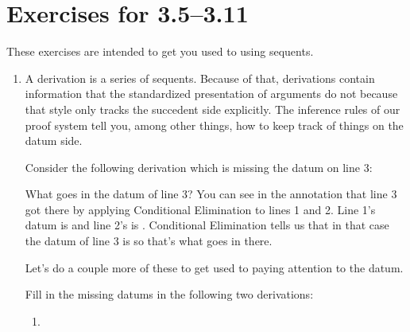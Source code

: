 
\section*{Exercises for 3.5--3.11}

These exercises are intended to get you used to using sequents.

\begin{enumerate}
 \item A derivation is a series of sequents. Because of that, derivations 
  contain information that the standardized presentation of arguments do not 
  because that style only tracks the succedent side explicitly. The inference 
  rules of our proof system tell you, among other things, how to keep track of 
  things on the datum side.
 
  Consider the following derivation which is missing the datum on line 3: 


\begin{argument*}




\end{argument*}


  What goes in the datum of line 3? You can see in the annotation that line 3 
  got there by applying Conditional Elimination to lines 1 and 2. Line 1's datum 
  is \p{\Gamma} and line 2's is \p{\Delta}. Conditional Elimination tells us 
  that in that case the datum of line 3 is \p{\Gamma,\Delta} so that's what goes 
  in there. 

  Let's do a couple more of these to get used to paying attention to the datum.

  Fill in the missing datums in the following two derivations:
\begin{enumerate}\setlength{\itemsep}{1.5em}
\item

\begin{argument*}





\end{argument*}
\end{enumerate}
\end{enumerate}
